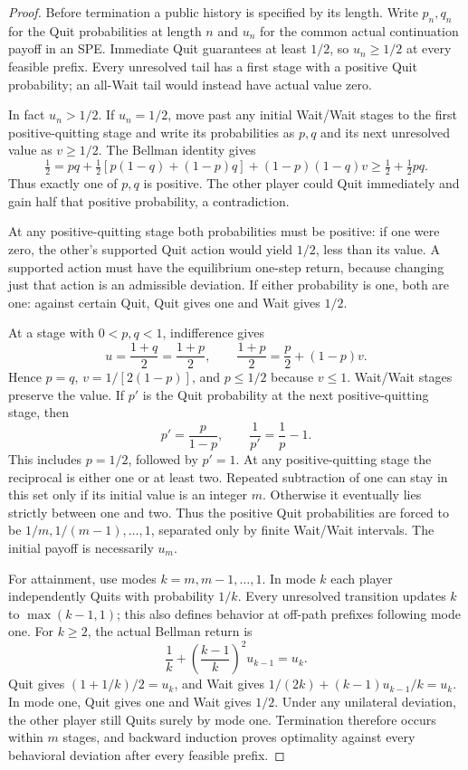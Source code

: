 \documentclass[11pt]{article}
\begin{document}
\begin{proof}
Before termination a public history is specified by its length.
Write $p_n,q_n$ for the Quit probabilities at length $n$ and $u_n$
for the common actual continuation payoff in an SPE. Immediate Quit
guarantees at least $1/2$, so $u_n\geq1/2$ at every feasible prefix.
Every unresolved tail has a first stage with a positive Quit probability;
an all-Wait tail would instead have actual value zero.

In fact $u_n>1/2$. If $u_n=1/2$, move past any initial Wait/Wait stages
to the first positive-quitting stage and write its probabilities as
$p,q$ and its next unresolved value as $v\geq1/2$. The Bellman identity gives
\[
 \tfrac12=pq+\tfrac12[p(1-q)+(1-p)q]+(1-p)(1-q)v
 \geq\tfrac12+\tfrac12pq.
\]
Thus exactly one of $p,q$ is positive. The other player could Quit
immediately and gain half that positive probability, a contradiction.

At any positive-quitting stage both probabilities must be positive:
if one were zero, the other's supported Quit action would yield $1/2$,
less than its value. A supported action must have the equilibrium
one-step return, because changing just that action is an admissible
deviation. If either probability is one, both are one: against certain
Quit, Quit gives one and Wait gives $1/2$.

At a stage with $0<p,q<1$, indifference gives
\[
 u=\frac{1+q}{2}=\frac{1+p}{2},\qquad
 \frac{1+p}{2}=\frac p2+(1-p)v.
\]
Hence $p=q$, $v=1/[2(1-p)]$, and $p\leq1/2$ because $v\leq1$.
Wait/Wait stages preserve the value. If $p'$ is the Quit probability
at the next positive-quitting stage, then
\begin{equation}\label{eq:recip}
 p'=\frac p{1-p},\qquad \frac1{p'}=\frac1p-1.
\end{equation}
This includes $p=1/2$, followed by $p'=1$.
At any positive-quitting stage the reciprocal is either one or at
least two. Repeated subtraction of one can stay in this set only if
its initial value is an integer $m$. Otherwise it eventually lies
strictly between one and two. Thus the positive Quit probabilities
are forced to be $1/m,1/(m-1),\ldots,1$, separated only by finite
Wait/Wait intervals. The initial payoff is necessarily $u_m$.

For attainment, use modes $k=m,m-1,\ldots,1$. In mode $k$ each player
independently Quits with probability $1/k$. Every unresolved transition
updates $k$ to $\max(k-1,1)$; this also defines behavior at off-path
prefixes following mode one. For $k\geq2$, the actual Bellman return is
\[
 \frac1k+\left(\frac{k-1}{k}\right)^2u_{k-1}=u_k.
\]
Quit gives $(1+1/k)/2=u_k$, and Wait gives
$1/(2k)+(k-1)u_{k-1}/k=u_k$. In mode one, Quit gives one and Wait
gives $1/2$. Under any unilateral deviation, the other player still
Quits surely by mode one. Termination therefore occurs within $m$
stages, and backward induction proves optimality against every
behavioral deviation after every feasible prefix.


\end{proof}
\end{document}
